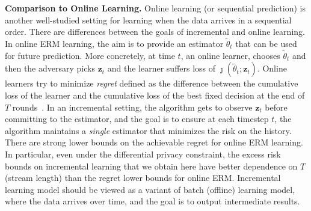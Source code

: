 \documentclass{article}
\theoremstyle{plain}
\def \z {\mathbf z}
\begin{document}
\smallskip
\noindent\textbf{Comparison to Online Learning.} 
Online learning (or sequential prediction) is another well-studied setting for learning when the data arrives in a sequential order. There are differences between the goals of incremental and online learning.  In online ERM learning, the aim is to provide an estimator $\tilde{\theta}_t$ that can be used for future prediction. More concretely, at time $t$, an online learner, chooses $\tilde{\theta}_t$ and then the adversary picks $\z_t$ and the learner suffers loss of $\jmath(\tilde{\theta}_t;\z_t)$. Online learners try to minimize {\em regret} defined as the difference between the cumulative loss of the learner and the cumulative loss of the best fixed decision at the end of $T$ rounds~\cite{shalev2011online}. In an incremental setting, the algorithm gets to observe $\z_t$ before committing to the estimator, and the goal is to ensure at each timestep $t$, the algorithm maintains a {\em single} estimator that minimizes the risk on the history. There are strong lower bounds on the achievable regret for online ERM learning. In particular, even under the differential privacy constraint, the excess risk bounds on incremental learning that we obtain here have better dependence on $T$ (stream length) than the regret lower bounds for online ERM.
Incremental learning model should be viewed as a variant of batch (offline) learning model, where the data arrives over time, and the goal is to output intermediate results.
\end{document}
